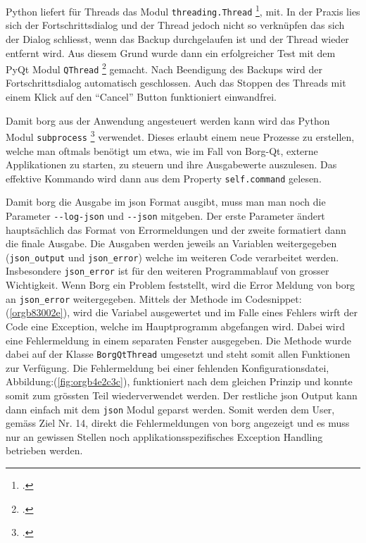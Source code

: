 Python liefert für Threads das Modul \texttt{threading.Thread} \footcite{threading},
mit. In der Praxis lies sich der Fortschrittsdialog und der Thread jedoch nicht
so verknüpfen das sich der Dialog schliesst, wenn das Backup durchgelaufen
ist und der Thread wieder entfernt wird. Aus diesem Grund wurde dann ein
erfolgreicher Test mit dem PyQt Modul \texttt{QThread} \footcite{qthread} gemacht. Nach
Beendigung des Backups wird der Fortschrittsdialog automatisch geschlossen.
Auch das Stoppen des Threads mit einem Klick auf den "`Cancel"' Button
funktioniert einwandfrei.

Damit \gls{borg} aus der Anwendung angesteuert werden kann wird das Python Modul\newline
\texttt{subprocess} \footcite{subprocess} verwendet. Dieses erlaubt einem neue Prozesse
zu erstellen, welche man oftmals benötigt um etwa, wie im Fall von Borg-Qt,
externe Applikationen zu starten, zu steuern und ihre Ausgabewerte auszulesen.
Das effektive Kommando wird dann aus dem Property \texttt{self.command} gelesen.

Damit \gls{borg} die Ausgabe im \gls{json} Format ausgibt, muss man man noch die
Parameter \texttt{-{}-log-json} und \texttt{-{}-json} mitgeben. Der erste Parameter ändert
hauptsächlich das Format von Errormeldungen und der zweite formatiert dann die
finale Ausgabe. Die Ausgaben werden jeweils an Variablen weitergegeben
(\texttt{json\_output} und \texttt{json\_error}) welche im weiteren Code verarbeitet werden.
\newpage
Insbesondere \texttt{json\_error} ist für den weiteren Programmablauf von grosser
Wichtigkeit. Wenn Borg ein Problem feststellt, wird die Error Meldung von
\gls{borg} an \texttt{json\_error} weitergegeben. Mittels der Methode im
Codesnippet:(\ref{orgb83002e}), wird die Variabel ausgewertet und im Falle eines
Fehlers wirft der Code eine Exception, welche im Hauptprogramm abgefangen wird.
Dabei wird eine Fehlermeldung in einem separaten Fenster ausgegeben. Die
Methode wurde dabei auf der Klasse \texttt{BorgQtThread} umgesetzt und steht somit
allen Funktionen zur Verfügung. Die Fehlermeldung bei einer fehlenden
Konfigurationsdatei, Abbildung:(\ref{fig:orgb4e2c3c}), funktioniert nach
dem gleichen Prinzip und konnte somit zum grössten Teil wiederverwendet werden.
Der restliche \gls{json} Output kann dann einfach mit dem \texttt{json} Modul geparst
werden. Somit werden dem User, gemäss Ziel Nr. 14, direkt die Fehlermeldungen
von \gls{borg} angezeigt und es muss nur an gewissen Stellen noch
applikationsspezifisches Exception Handling betrieben werden.

